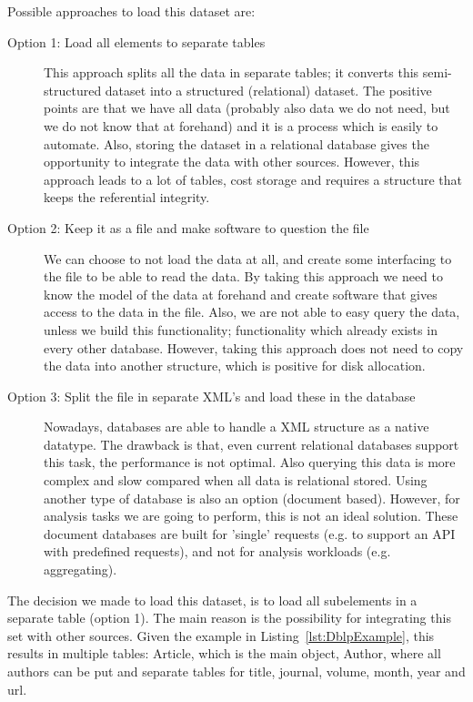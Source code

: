 \documentclass{ou-report}
\begin{document}
Possible approaches to load this dataset are:
\begin{description}
\item[Option 1: Load all elements to separate tables] This approach splits all 
the data in separate tables; it converts this semi-structured dataset into a 
structured (relational) dataset. The positive points are that we have all data 
(probably also data we do not need, but we do not know that at forehand) and it 
is a process which is easily to automate. Also, storing the dataset in a 
relational database gives the opportunity to integrate the data with other 
sources. However, this approach leads to a lot of tables, cost storage and 
requires a structure that keeps the referential integrity.
\item[Option 2: Keep it as a file and make software to question the file] We can 
choose to not load the data at all, and create some interfacing to the file to 
be able to read the data. By taking this approach we need to know the model of 
the data at forehand and create software that gives access to the data in the 
file. Also, we are not able to easy query the data, unless we build this 
functionality; functionality which already exists in \mbox{every} other database. 
However, taking this approach does not need to copy the data into another 
structure, which is positive for disk allocation.
\item[Option 3: Split the file in separate XML's and load these in the database] 
Nowadays, databases are able to handle a XML structure as a native datatype. The 
drawback is that, even current relational databases support this task, the 
performance is not optimal. Also querying this data is more complex and slow 
compared when all data is relational stored. Using another type of database is also 
an option (document based). However, for analysis tasks we are going to perform, 
this is not an ideal solution. These document databases are built for 'single' 
requests (e.g. to support an API with predefined requests), and not for 
analysis workloads (e.g. aggregating).
\end{description}
The decision we made to load this dataset, is to load all subelements in a 
separate table (option 1). The main reason is the possibility for integrating 
this set with other sources. Given the example in Listing~\ref{lst:DblpExample}, 
this results in multiple tables: Article, which is the main object, Author, 
where all authors can be put and separate tables for title, journal, volume, 
month, year and url.
\end{document}
